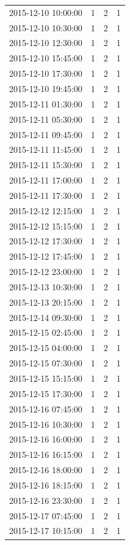 \begin{tabular}{lrrr}
2015-12-10 10:00:00 & 1 & 2 & 1 \\
2015-12-10 10:30:00 & 1 & 2 & 1 \\
2015-12-10 12:30:00 & 1 & 2 & 1 \\
2015-12-10 15:45:00 & 1 & 2 & 1 \\
2015-12-10 17:30:00 & 1 & 2 & 1 \\
2015-12-10 19:45:00 & 1 & 2 & 1 \\
2015-12-11 01:30:00 & 1 & 2 & 1 \\
2015-12-11 05:30:00 & 1 & 2 & 1 \\
2015-12-11 09:45:00 & 1 & 2 & 1 \\
2015-12-11 11:45:00 & 1 & 2 & 1 \\
2015-12-11 15:30:00 & 1 & 2 & 1 \\
2015-12-11 17:00:00 & 1 & 2 & 1 \\
2015-12-11 17:30:00 & 1 & 2 & 1 \\
2015-12-12 12:15:00 & 1 & 2 & 1 \\
2015-12-12 15:15:00 & 1 & 2 & 1 \\
2015-12-12 17:30:00 & 1 & 2 & 1 \\
2015-12-12 17:45:00 & 1 & 2 & 1 \\
2015-12-12 23:00:00 & 1 & 2 & 1 \\
2015-12-13 10:30:00 & 1 & 2 & 1 \\
2015-12-13 20:15:00 & 1 & 2 & 1 \\
2015-12-14 09:30:00 & 1 & 2 & 1 \\
2015-12-15 02:45:00 & 1 & 2 & 1 \\
2015-12-15 04:00:00 & 1 & 2 & 1 \\
2015-12-15 07:30:00 & 1 & 2 & 1 \\
2015-12-15 15:15:00 & 1 & 2 & 1 \\
2015-12-15 17:30:00 & 1 & 2 & 1 \\
2015-12-16 07:45:00 & 1 & 2 & 1 \\
2015-12-16 10:30:00 & 1 & 2 & 1 \\
2015-12-16 16:00:00 & 1 & 2 & 1 \\
2015-12-16 16:15:00 & 1 & 2 & 1 \\
2015-12-16 18:00:00 & 1 & 2 & 1 \\
2015-12-16 18:15:00 & 1 & 2 & 1 \\
2015-12-16 23:30:00 & 1 & 2 & 1 \\
2015-12-17 07:45:00 & 1 & 2 & 1 \\
2015-12-17 10:15:00 & 1 & 2 & 1 \\

\end{tabular}
